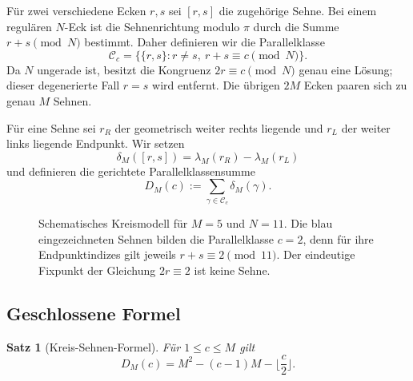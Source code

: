 \documentclass[11pt,a4paper]{article}
\newtheorem{satz}{Satz}[section]
\theoremstyle{definition}
\theoremstyle{remark}
\newcommand{\N}{\mathbb N}
\begin{document}
Für zwei verschiedene Ecken $r,s$ sei $[r,s]$ die zugehörige Sehne. Bei einem regulären $N$-Eck ist die Sehnenrichtung modulo $\pi$ durch die Summe $r+s\pmod N$ bestimmt. Daher definieren wir die Parallelklasse
\[
\mathcal C_c
=\bigl\{\{r,s\}:r\ne s,\ r+s\equiv c\pmod N\bigr\}.
\]
Da $N$ ungerade ist, besitzt die Kongruenz $2r\equiv c\pmod N$ genau eine Lösung; dieser degenerierte Fall $r=s$ wird entfernt. Die übrigen $2M$ Ecken paaren sich zu genau $M$ Sehnen.

Für eine Sehne sei $r_R$ der geometrisch weiter rechts liegende und $r_L$ der weiter links liegende Endpunkt. Wir setzen
\[
\delta_M([r,s])=\lambda_M(r_R)-\lambda_M(r_L)
\]
und definieren die gerichtete Parallelklassensumme
\[
D_M(c):=\sum_{\gamma\in\mathcal C_c}\delta_M(\gamma).
\]

\begin{figure}[t]
\centering
{}
\caption{Schematisches Kreismodell für $M=5$ und $N=11$. Die blau eingezeichneten Sehnen bilden die Parallelklasse $c=2$, denn für ihre Endpunktindizes gilt jeweils $r+s\equiv2\pmod{11}$. Der eindeutige Fixpunkt der Gleichung $2r\equiv2$ ist keine Sehne.}
\label{fig:circle}
\end{figure}

\subsection{Geschlossene Formel}

\begin{satz}[Kreis-Sehnen-Formel]\label{thm:Dformula}
Für $1\le c\le M$ gilt
\[
\boxed{
D_M(c)=M^2-(c-1)M-\Big\lfloor\frac c2\Big\rfloor.
}
\]
\end{satz}
\end{document}
